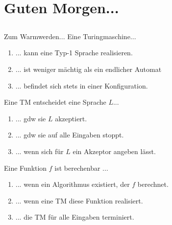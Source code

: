 \section[Einstieg]{Guten Morgen...}
\subsection*{}
\begin{frame}{Zum Warmwerden...}
	 Eine Turingmaschine...
	   \begin{enumerate}
	   \item { \only<2->{ \color{green!50!black} }
	   ... kann eine Typ-1 Sprache realisieren.
	   }
	   \item { \only<2->{ \color{red} }
	   ... ist weniger mächtig als ein endlicher Automat
	   }
	   \item { \only<2->{ \color{green!50!black} }
	   ... befindet sich stets in einer Konfiguration.
	   }
	   \end{enumerate}

	 Eine TM entscheidet eine Sprache $L$...
	   \begin{enumerate}
	   \item { \only<3->{ \color{red} }
	   ... gdw sie $L$ akzeptiert.
	   }
	   \item { \only<3->{ \color{red} }
	   ... gdw sie auf alle Eingaben stoppt.
	   }
	   \item { \only<3->{ \color{red} }
	   ... wenn sich für $L$ ein Akzeptor angeben lässt.
	   }
	   \end{enumerate}

	 Eine Funktion $f$ ist berechenbar ...
	   \begin{enumerate}
	   \item { \only<4>{ \color{green!50!black} }
	   ... wenn ein Algorithmus existiert, der $f$ berechnet.
	   }
	   \item { \only<4>{ \color{green!50!black} }
	   ... wenn eine TM diese Funktion realisiert.
	   }
	   \item { \only<4>{ \color{red} }
	   ... die TM für alle Eingaben terminiert.
	   }
	   \end{enumerate}
\end{frame}
